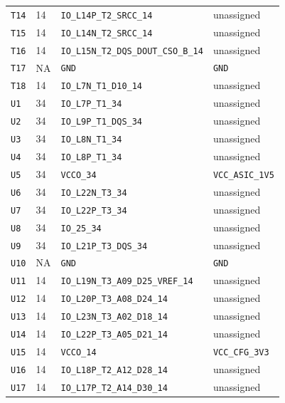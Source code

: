 \documentclass[11pt,a4paper]{article}
\begin{document}
\begin{longtable}{@{}P{13mm}P{13mm}P{78mm}P{62mm}@{}}
\nolinkurl{T14} & 14 & \nolinkurl{IO_L14P_T2_SRCC_14} & \textcolor{muted}{unassigned} \\
\nolinkurl{T15} & 14 & \nolinkurl{IO_L14N_T2_SRCC_14} & \textcolor{muted}{unassigned} \\
\nolinkurl{T16} & 14 & \nolinkurl{IO_L15N_T2_DQS_DOUT_CSO_B_14} & \textcolor{muted}{unassigned} \\
\nolinkurl{T17} & NA & \nolinkurl{GND} & \nolinkurl{GND} \\
\nolinkurl{T18} & 14 & \nolinkurl{IO_L7N_T1_D10_14} & \textcolor{muted}{unassigned} \\
\nolinkurl{U1} & 34 & \nolinkurl{IO_L7P_T1_34} & \textcolor{muted}{unassigned} \\
\nolinkurl{U2} & 34 & \nolinkurl{IO_L9P_T1_DQS_34} & \textcolor{muted}{unassigned} \\
\nolinkurl{U3} & 34 & \nolinkurl{IO_L8N_T1_34} & \textcolor{muted}{unassigned} \\
\nolinkurl{U4} & 34 & \nolinkurl{IO_L8P_T1_34} & \textcolor{muted}{unassigned} \\
\nolinkurl{U5} & 34 & \nolinkurl{VCCO_34} & \nolinkurl{VCC_ASIC_1V5} \\
\nolinkurl{U6} & 34 & \nolinkurl{IO_L22N_T3_34} & \textcolor{muted}{unassigned} \\
\nolinkurl{U7} & 34 & \nolinkurl{IO_L22P_T3_34} & \textcolor{muted}{unassigned} \\
\nolinkurl{U8} & 34 & \nolinkurl{IO_25_34} & \textcolor{muted}{unassigned} \\
\nolinkurl{U9} & 34 & \nolinkurl{IO_L21P_T3_DQS_34} & \textcolor{muted}{unassigned} \\
\nolinkurl{U10} & NA & \nolinkurl{GND} & \nolinkurl{GND} \\
\nolinkurl{U11} & 14 & \nolinkurl{IO_L19N_T3_A09_D25_VREF_14} & \textcolor{muted}{unassigned} \\
\nolinkurl{U12} & 14 & \nolinkurl{IO_L20P_T3_A08_D24_14} & \textcolor{muted}{unassigned} \\
\nolinkurl{U13} & 14 & \nolinkurl{IO_L23N_T3_A02_D18_14} & \textcolor{muted}{unassigned} \\
\nolinkurl{U14} & 14 & \nolinkurl{IO_L22P_T3_A05_D21_14} & \textcolor{muted}{unassigned} \\
\nolinkurl{U15} & 14 & \nolinkurl{VCCO_14} & \nolinkurl{VCC_CFG_3V3} \\
\nolinkurl{U16} & 14 & \nolinkurl{IO_L18P_T2_A12_D28_14} & \textcolor{muted}{unassigned} \\
\nolinkurl{U17} & 14 & \nolinkurl{IO_L17P_T2_A14_D30_14} & \textcolor{muted}{unassigned} \\

\end{longtable}
\end{document}
